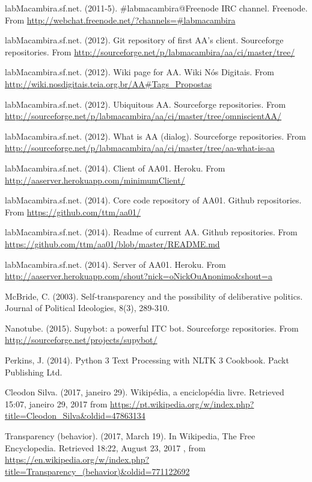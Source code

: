 \documentclass[12pt,fleqn]{article}
\begin{document}
\begin{thebibliography}{99}
	labMacambira.sf.net. (2011-5). \#labmacambira@Freenode IRC channel.
		Freenode. From \url{http://webchat.freenode.net/?channels=#labmacambira}

	labMacambira.sf.net. (2012). Git repository of first AA's client.
		Sourceforge repositories. From \url{http://sourceforge.net/p/labmacambira/aa/ci/master/tree/}

	labMacambira.sf.net. (2012). Wiki page for AA.
		Wiki Nós Digitais. From \url{http://wiki.nosdigitais.teia.org.br/AA#Tags_Propostas}

	labMacambira.sf.net. (2012). Ubiquitous AA.
		Sourceforge repositories. From \url{http://sourceforge.net/p/labmacambira/aa/ci/master/tree/omniscientAA/}

	labMacambira.sf.net. (2012). What is AA (dialog).
		Sourceforge repositories. From \url{http://sourceforge.net/p/labmacambira/aa/ci/master/tree/aa-what-is-aa}

	labMacambira.sf.net. (2014). Client of AA01.
		Heroku. From \url{http://aaserver.herokuapp.com/minimumClient/}

	labMacambira.sf.net. (2014). Core code repository of AA01.
		Github repositories. From \url{https://github.com/ttm/aa01/}

	labMacambira.sf.net. (2014). Readme of current AA.
		Github repositories. From \url{https://github.com/ttm/aa01/blob/master/README.md}

	labMacambira.sf.net. (2014). Server of AA01.
		Heroku. From \url{http://aaserver.herokuapp.com/shout?nick=oNickOuAnonimo&shout=a}

McBride, C. (2003). Self-transparency and the possibility of deliberative politics. Journal of Political Ideologies, 8(3), 289-310.

	Nanotube. (2015). Supybot: a powerful ITC bot.
		Sourceforge repositories. From \url{http://sourceforge.net/projects/supybot/}

Perkins, J. (2014). Python 3 Text Processing with NLTK 3 Cookbook. Packt Publishing Ltd.

	Cleodon Silva. (2017, janeiro 29). Wikipédia, a enciclopédia livre. Retrieved 15:07, janeiro 29, 2017 from \url{https://pt.wikipedia.org/w/index.php?title=Cleodon_Silva&oldid=47863134}


	Transparency (behavior). (2017, March 19). In Wikipedia, The Free Encyclopedia. Retrieved
		18:22, August 23, 2017
		, from \url{https://en.wikipedia.org/w/index.php?title=Transparency_(behavior)&oldid=771122692}
\end{thebibliography}
\end{document}
